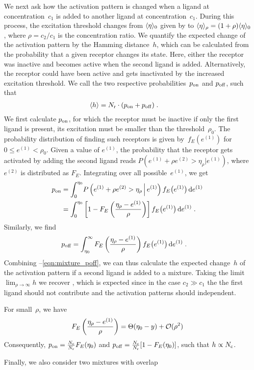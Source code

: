 \documentclass[twocolumn, superscriptaddress]{revtex4}
\newcommand{\Nc}{{N_{\rm c}}}
\newcommand{\Nr}{{N_{\rm r}}}
\renewcommand{\eqref}[1]{\ref{#1}}
\begin{document}
We next ask how the activation pattern is changed when a ligand at concentration~$c_1$ is added to another ligand at concentration~$c_1$.
During this process, the excitation threshold changes from $\langle \eta \rangle_0$ given by  to $\langle \eta \rangle_\rho = (1 + \rho)\langle \eta \rangle_0$, where $\rho=c_2/c_1$ is the concentration ratio.
We quantify the expected change of the activation pattern by the Hamming distance~$h$, which can be calculated from the probability that a given receptor changes its state.
Here, either the receptor was inactive and becomes active when the second ligand is added.
Alternatively, the receptor could have been active and gets inactivated by the increased excitation threshold.
We call the two respective probabilities~$p_{\rm on}$ and $p_{\rm off}$, such that
\begin{align}
	\mean h &= \Nr \cdot(p_{\rm on} + p_{\rm off})
	\label{eqn:mixture_hamming}
	\;.
\end{align}
We first calculate $p_{\rm on}$, for which the receptor must be inactive if only the first ligand is present, \ie its excitation must be smaller than the threshold~$\rho_0$.
The probability distribution of finding such receptors is given by~$f_E(e^{(1)})$ for $0 \le e^{(1)} <\rho_0$.
Given a value of $e^{(1)}$, the probability that the receptor gets activated by adding the second ligand reads $P(e^{(1)} + \rho e^{(2)} > \eta_\rho | e^{(1)})$, where $e^{(2)}$ is distributed as $F_E$.
Integrating over all possible~$e^{(1)}$, we get
\begin{align}
	p_{\rm on} &= \int_0^{\eta_0}
		\! P\left(e^{(1)} + \rho e^{(2)} > \eta_\rho \,\middle | \, e^{(1)} \right) f_E\bigl(e^{(1)}\bigr) \, \text{d} e^{(1)}
\notag\\
	&= \int_0^{\eta_0}
	\left[1 - F_E\left(\frac{\eta_\rho - e^{(1)}}{\rho}\right)\right]  f_E\bigl(e^{(1)}\bigr) \, \text{d} e^{(1)}
	\;.
\end{align}
Similarly, we find
\begin{align}
	p_{\rm off} &=\int_{\eta_0}^{\infty}
		F_E\left(\frac{\eta_\rho - e^{(1)}}{\rho}\right)  f_E\bigl(e^{(1)}\bigr) \, \text{d} e^{(1)}
	\label{eqn:mixture_poff}
	\;.
\end{align}
Combining --\eqref{eqn:mixture_poff}, we can thus calculate the expected change~$h$ of the activation pattern if a second ligand is added to a mixture.
Taking the limit $\lim_{\rho \rightarrow \infty} h$ we recover , which is expected since in the case $c_2 \gg c_1$ the the first ligand should not contribute and the activation patterns should independent.


\todo{Scaling for small~$\rho$. Expect: $h \propto \Nc\rho$, $p \propto \rho\Nc/\Nr$}
For small~$\rho$, we have
\begin{align}
	F_E\left(\frac{\eta_\rho - e^{(1)}}{\rho}\right) = \Theta(\eta_0 - y) + \mathcal{O}(\rho^2)
\end{align}
Consequently, $p_{\rm on} = \frac\Nc\Nr F_E(\eta_0)$ and $p_{\rm off} = \frac\Nc\Nr[1 -  F_E(\eta_0)]$, such that $h \propto \Nc$.

Finally, we also consider two mixtures with overlap



\end{document}
